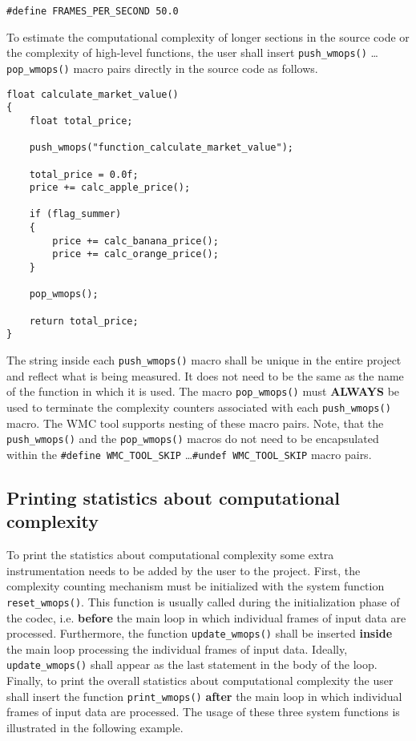 \begin{Verbatim}[fontsize=\small]
#define FRAMES_PER_SECOND 50.0
\end{Verbatim}

To estimate the computational complexity of longer sections in the source code or the complexity of high-level functions, the user shall insert \verb|push_wmops()| \ldots \verb|pop_wmops()| macro pairs directly in the source code as follows.

\begin{Verbatim}[fontsize=\small]
float calculate_market_value()
{
    float total_price;

    push_wmops("function_calculate_market_value");

    total_price = 0.0f;
    price += calc_apple_price();

    if (flag_summer)
    {
        price += calc_banana_price();
        price += calc_orange_price();
    }

    pop_wmops();

    return total_price;
}
\end{Verbatim}

The string inside each \verb|push_wmops()| macro shall be unique in the entire project and reflect what is being measured. It does not need to be the same as the name of the function in which it is used. The macro \verb|pop_wmops()| must \textbf{ALWAYS} be used to terminate the complexity counters associated with each \verb|push_wmops()| macro. The WMC tool supports nesting of these macro pairs. Note, that the \verb|push_wmops()| and the \verb|pop_wmops()| macros do not need to be encapsulated within the \verb|#define WMC_TOOL_SKIP| \ldots \verb|#undef WMC_TOOL_SKIP| macro pairs.

\subsection{Printing statistics about computational complexity}
\label{ch:printing_statistics_about_computational_complexity}

To print the statistics about computational complexity some extra instrumentation needs to be added by the user to the project. First, the complexity counting mechanism must be initialized with the system function \verb|reset_wmops()|. This function is usually called during the initialization phase of the codec, i.e. \textbf{before} the main loop in which individual frames of input data are processed. Furthermore, the function \verb|update_wmops()| shall be inserted \textbf{inside} the main loop processing the individual frames of input data. Ideally, \verb|update_wmops()| shall appear as the last statement in the body of the loop. Finally, to print the overall statistics about computational complexity the user shall insert the function \verb|print_wmops()| \textbf{after} the main loop in which individual frames of input data are processed. The usage of these three system functions is illustrated in the following example.

